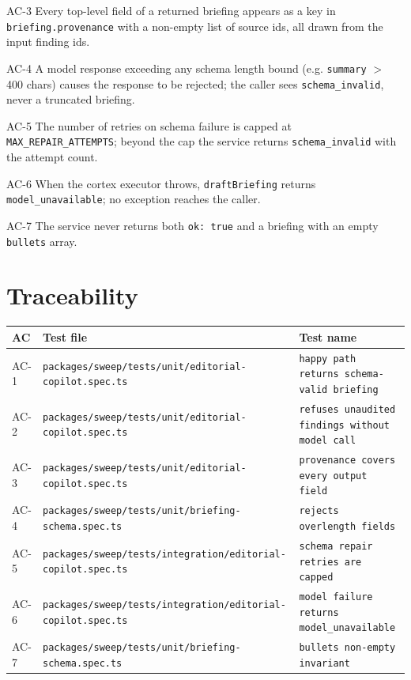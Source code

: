 \begin{ac}{AC-3}
Every top-level field of a returned briefing appears as a key in \texttt{briefing.provenance} with a non-empty list of source ids, all drawn from the input finding ids.
\end{ac}

\begin{ac}{AC-4}
A model response exceeding any schema length bound (e.g. \texttt{summary} $>$ 400 chars) causes the response to be rejected; the caller sees \texttt{schema\_invalid}, never a truncated briefing.
\end{ac}

\begin{ac}{AC-5}
The number of retries on schema failure is capped at \texttt{MAX\_REPAIR\_ATTEMPTS}; beyond the cap the service returns \texttt{schema\_invalid} with the attempt count.
\end{ac}

\begin{ac}{AC-6}
When the cortex executor throws, \texttt{draftBriefing} returns \texttt{model\_unavailable}; no exception reaches the caller.
\end{ac}

\begin{ac}{AC-7}
The service never returns both \texttt{ok: true} and a briefing with an empty \texttt{bullets} array.
\end{ac}

\section{Traceability}

\begin{center}
\begin{tabular}{@{}lll@{}}
\toprule
AC & Test file & Test name \\
\midrule
AC-1 & \texttt{packages/sweep/tests/unit/editorial-copilot.spec.ts} & \texttt{happy path returns schema-valid briefing} \\
AC-2 & \texttt{packages/sweep/tests/unit/editorial-copilot.spec.ts} & \texttt{refuses unaudited findings without model call} \\
AC-3 & \texttt{packages/sweep/tests/unit/editorial-copilot.spec.ts} & \texttt{provenance covers every output field} \\
AC-4 & \texttt{packages/sweep/tests/unit/briefing-schema.spec.ts} & \texttt{rejects overlength fields} \\
AC-5 & \texttt{packages/sweep/tests/integration/editorial-copilot.spec.ts} & \texttt{schema repair retries are capped} \\
AC-6 & \texttt{packages/sweep/tests/integration/editorial-copilot.spec.ts} & \texttt{model failure returns model\_unavailable} \\
AC-7 & \texttt{packages/sweep/tests/unit/briefing-schema.spec.ts} & \texttt{bullets non-empty invariant} \\
\bottomrule
\end{tabular}
\end{center}

